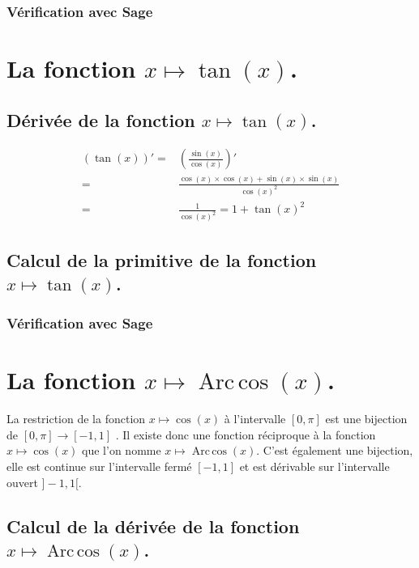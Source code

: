 \documentclass[a4paper,14pt]{extreport} %
\renewcommand{\arccos}{\mathop{\mathrm{Arc\,cos}}}
\begin{document}
\subsubsection{Vérification avec Sage}



\section{La fonction  $x \mapsto \tan(x)$.}

\subsection{Dérivée de la fonction $x \mapsto \tan(x)$.}


\begin{align*}
(\tan(x))' = & \left(\frac{\sin(x)}{\cos(x)}\right)' \\ = & \frac{\cos(x) \times \cos(x)+\sin(x)\times \sin(x)}{\cos(x)^2}  \\ = & \frac{1}{\cos(x)^2} = 1 + \tan(x)^2
\end{align*}

\subsection{Calcul de la primitive de la fonction  $x \mapsto \tan(x)$.}


\subsubsection{Vérification avec Sage}






\section{La fonction  $x \mapsto \arccos(x) $.}


La restriction de la fonction $x \mapsto \cos(x) $ à l'intervalle $[0,\pi]$ est une bijection de $[0,\pi] \rightarrow [-1,1]$ . Il existe donc une fonction réciproque à la fonction $x \mapsto \cos(x) $ que l'on nomme $x \mapsto \arccos(x) $. C'est également une bijection, elle est continue sur l'intervalle fermé  $ [-1,1]$ et est dérivable sur l'intervalle ouvert $]-1,1[$.

\subsection{Calcul de la dérivée de la fonction $x \mapsto \arccos(x) $.}
\end{document}
